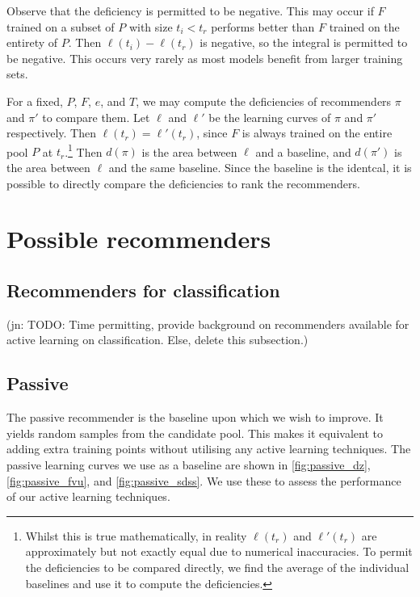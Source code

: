 \documentclass[11pt,twoside,openright]{report}
\newcommand\jn[1]{{\color{red}(jn: #1)}}
\begin{document}
Observe that the deficiency is permitted to be negative. This may occur if $F$ trained on a subset of $P$ with size $t_i < t_r$ performs better than $F$ trained on the entirety of $P$. Then $\ell(t_i) - \ell(t_r)$ is negative, so the integral is permitted to be negative. This occurs very rarely as most models benefit from larger training sets.

For a fixed, $P$, $F$, $e$, and $T$, we may compute the deficiencies of recommenders $\pi$ and $\pi'$ to compare them. Let $\ell$ and $\ell'$ be the learning curves of $\pi$ and $\pi'$ respectively. Then $\ell(t_r) = \ell'(t_r)$, since $F$ is always trained on the entire pool $P$ at $t_r$.\footnote{Whilst this is true mathematically, in reality $\ell(t_r)$ and $\ell'(t_r)$ are approximately but not exactly equal due to numerical inaccuracies. To permit the deficiencies to be compared directly, we find the average of the individual baselines and use it to compute the deficiencies.} Then $d(\pi)$ is the area between $\ell$ and a baseline, and $d(\pi')$ is the area between $\ell$ and the same baseline. Since the baseline is the identcal, it is possible to directly compare the deficiencies to rank the recommenders.

\section{Possible recommenders}

\subsection{Recommenders for classification}

\jn{TODO: Time permitting, provide background on recommenders available for active learning on classification. Else, delete this subsection.}

\subsection{Passive}

The passive recommender is the baseline upon which we wish to improve. It yields random samples from the candidate pool. This makes it equivalent to adding extra training points without utilising any active learning techniques. The passive learning curves we use as a baseline are shown in \cref{fig:passive_dz}, \cref{fig:passive_fvu}, and \cref{fig:passive_sdss}. We use these to assess the performance of our active learning techniques.
\end{document}
